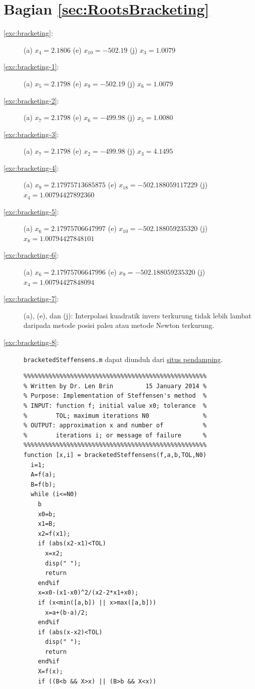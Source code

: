 \section*{Bagian \ref{sec:RootsBracketing}}
\begin{description}
\item [{\ref{exc:bracketing}:}] (a) $x_{4}=2.1806$ (e) $x_{10}=-502.19$
(j) $x_{3}=1.0079$
\item [{\ref{exc:bracketing-1}:}] (a) $x_{5}=2.1798$ (e) $x_{9}=-502.19$
(j) $x_{6}=1.0079$
\item [{\ref{exc:bracketing-2}:}] (a) $x_{7}=2.1798$ (e) $x_{6}=-499.98$
(j) $x_{5}=1.0080$
\item [{\ref{exc:bracketing-3}:}] (a) $x_{7}=2.1798$ (e) $x_{2}=-499.98$
(j) $x_{3}=4.1495$
\item [{\ref{exc:bracketing-4}:}] (a) $x_{9}=2.17975713685875$ (e) $x_{18}=-502.188059117229$
(j) $x_{4}=1.00794427892360$
\item [{\ref{exc:bracketing-5}:}] (a) $x_{6}=2.17975706647997$ (e) $x_{10}=-502.188059235320$
(j) $x_{8}=1.00794427848101$
\item [{\ref{exc:bracketing-6}:}] (a) $x_{6}=2.17975706647996$ (e) $x_{9}=-502.188059235320$
(j) $x_{4}=1.00794427848094$
\item [{\ref{exc:bracketing-7}:}] (a), (e), dan (j): Interpolasi kuadratik
invers terkurung tidak lebih lambat daripada metode posisi palsu atau
metode Newton terkurung.
\item [{\ref{exc:bracketing-8}:}]  \texttt{bracketedSteffensens.m}
dapat diunduh dari \href{http://lqbrin.github.io/tea-time-numerical/ancillaries.html}{situs pendamping}.
\begin{verbatim}
%%%%%%%%%%%%%%%%%%%%%%%%%%%%%%%%%%%%%%%%%%%%%%%%%%%
% Written by Dr. Len Brin         15 January 2014 %
% Purpose: Implementation of Steffensen's method  %
% INPUT: function f; initial value x0; tolerance  %
%        TOL; maximum iterations N0               %
% OUTPUT: approximation x and number of           %
%        iterations i; or message of failure      %
%%%%%%%%%%%%%%%%%%%%%%%%%%%%%%%%%%%%%%%%%%%%%%%%%%%
function [x,i] = bracketedSteffensens(f,a,b,TOL,N0)
  i=1;
  A=f(a);
  B=f(b);
  while (i<=N0)
    b
    x0=b;
    x1=B;
    x2=f(x1);
    if (abs(x2-x1)<TOL)
      x=x2;
      disp(" ");
      return
    end%if
    x=x0-(x1-x0)^2/(x2-2*x1+x0);
    if (x<min([a,b]) || x>max([a,b]))
      x=a+(b-a)/2;
    end%if
    if (abs(x-x2)<TOL)
      disp(" ");
      return
    end%if
    X=f(x);
    if ((B<b && X>x) || (B>b && X<x))

\end{verbatim}
\end{description}
